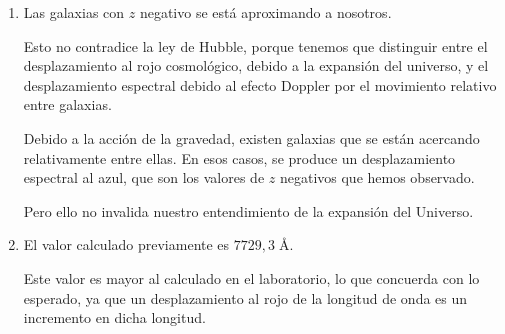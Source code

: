 \begin{enumerate}
    \vspace{20px}

    \item Las galaxias con $z$ negativo se está aproximando a nosotros.

    Esto no contradice la ley de Hubble, porque tenemos que distinguir entre el desplazamiento al rojo cosmológico, debido a la expansión del universo,
    y el desplazamiento espectral debido al efecto Doppler por el movimiento relativo entre galaxias.

    Debido a la acción de la gravedad, existen galaxias que se están acercando relativamente entre ellas. En esos casos, se produce un desplazamiento
    espectral al azul, que son los valores de $z$ negativos que hemos observado.

    Pero ello no invalida nuestro entendimiento de la expansión del Universo.

    \vspace{20px}

    \item El valor calculado previamente es $7729, 3  \; \si{\angstrom}$.

    Este valor es mayor al calculado en el laboratorio, lo que concuerda con lo esperado, ya que un desplazamiento al rojo de la longitud de onda
    es un incremento en dicha longitud.



\end{enumerate}